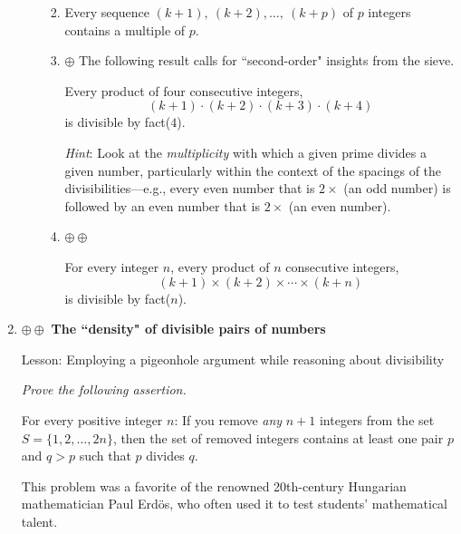 \begin{enumerate}
\begin{enumerate}
\begin{enumerate}
     \medskip\item
\begin{prop}
Every sequence $(k+1), \ (k+2), \ldots, \ (k+p)$ of $p$ integers contains a multiple of $p$.
\end{prop}

      \medskip\item 
      $\oplus$ The following result calls for ``second-order" insights from the sieve.
\begin{prop}
Every product of four consecutive integers,
\[ (k+1) \cdot (k+2) \cdot (k+3) \cdot (k+4) \]
is divisible by {\sc fact}($4$).
\end{prop}

\smallskip

{\em Hint}:  Look at the {\em multiplicity} with which a given prime divides a given number, particularly within the context of the spacings of the divisibilities---e.g., every even number that is $2 \times$ (an odd number) is followed by an even number that is $2 \times$ (an even number).  

  \medskip\item
$\oplus \oplus$ 
\begin{prop}
For every integer $n$, every product of $n$ consecutive integers,
\[ (k+1) \times (k+2) \times \cdots \times (k+n) \]
is divisible by {\sc fact}($n$).
\end{prop}
     \end{enumerate}
  \end{enumerate}


  \medskip\item
$\oplus \oplus$
{\bf The ``density"  of divisible pairs of numbers}

{\sc Lesson:} Employing a pigeonhole argument while reasoning about divisibility

\smallskip

{\em Prove the following assertion.}

\begin{prop}
For every positive integer $n$:  If you remove {\em any} $n+1$ integers from the set $S = \{ 1, 2, \ldots, 2n\}$, then the set of removed integers contains at least one pair $p$ and $q > p$ such that $p$ divides $q$.
\end{prop}


This problem was a favorite of the renowned 20th-century Hungarian mathematician Paul Erd\"{o}s, who often used it to test students' mathematical talent.


\end{enumerate}
